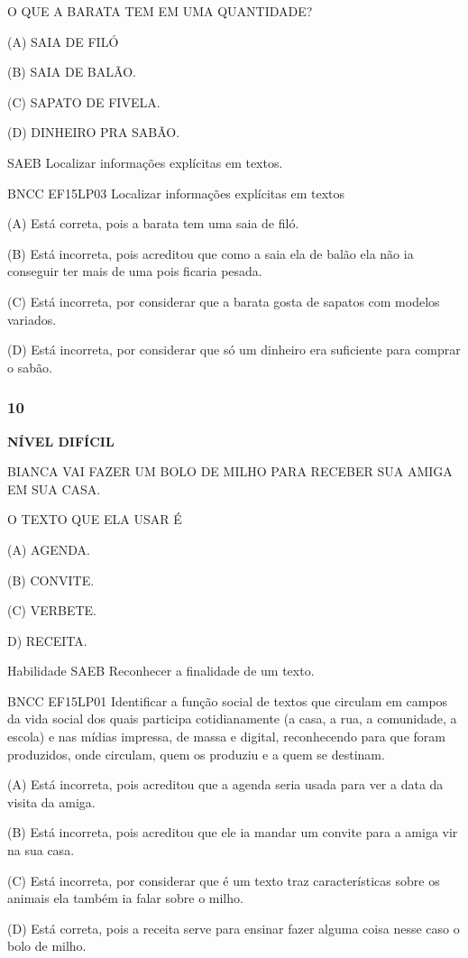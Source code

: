 O QUE A BARATA TEM EM UMA QUANTIDADE?

(A) SAIA DE FILÓ

(B) SAIA DE BALÃO.

(C) SAPATO DE FIVELA.

(D) DINHEIRO PRA SABÃO.

SAEB Localizar informações explícitas em textos.

BNCC EF15LP03 Localizar informações explícitas em textos

(A) Está correta, pois a barata tem uma saia de filó.

(B) Está incorreta, pois acreditou que como a saia ela de balão ela não
ia conseguir ter mais de uma pois ficaria pesada.

(C) Está incorreta, por considerar que a barata gosta de sapatos com
modelos variados.

(D) Está incorreta, por considerar que só um dinheiro era suficiente
para comprar o sabão.

\subsubsection{10}\label{section-103}

\textbf{NÍVEL DIFÍCIL}

BIANCA VAI FAZER UM BOLO DE MILHO PARA RECEBER SUA AMIGA EM SUA CASA.

O TEXTO QUE ELA USAR É

(A) AGENDA.

(B) CONVITE.

(C) VERBETE.

D) RECEITA.

Habilidade SAEB Reconhecer a finalidade de um texto.

BNCC EF15LP01 Identificar a função social de textos que circulam em
campos da vida social dos quais participa cotidianamente (a casa, a rua,
a comunidade, a escola) e nas mídias impressa, de massa e digital,
reconhecendo para que foram produzidos, onde circulam, quem os produziu
e a quem se destinam.

(A) Está incorreta, pois acreditou que a agenda seria usada para ver a
data da visita da amiga.

(B) Está incorreta, pois acreditou que ele ia mandar um convite para a
amiga vir na sua casa.

(C) Está incorreta, por considerar que é um texto traz características
sobre os animais ela também ia falar sobre o milho.

(D) Está correta, pois a receita serve para ensinar fazer alguma coisa
nesse caso o bolo de milho.

